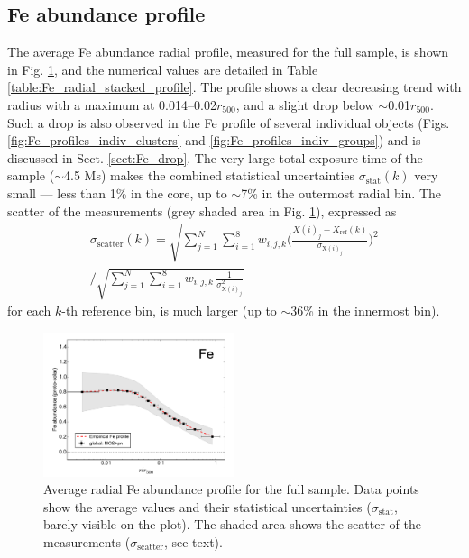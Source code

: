 \documentclass{aa}
\begin{document}
\subsection{Fe abundance profile}\label{sect:results_Fe}

The average Fe abundance radial profile, measured for the full sample, is shown in Fig. \ref{fig:Fe_radial_stacked_profile}, and the numerical values are detailed in Table \ref{table:Fe_radial_stacked_profile}. The profile shows a clear decreasing trend with radius with a maximum at 0.014--0.02$r_{500}$, and a slight drop below $\sim$0.01$r_{500}$. Such a drop is also observed in the Fe profile of several individual objects (Figs. \ref{fig:Fe_profiles_indiv_clusters} and \ref{fig:Fe_profiles_indiv_groups}) and is discussed in Sect. \ref{sect:Fe_drop}. The very large total exposure time of the sample ($\sim$4.5 Ms) makes the combined statistical uncertainties $\sigma_\text{stat}(k)$ very small --- less than 1\% in the core, up to $\sim$7\% in the outermost radial bin. The scatter of the measurements (grey shaded area in Fig. \ref{fig:Fe_radial_stacked_profile}), expressed as
\begin{align}
\sigma_\text{scatter}(k) = \sqrt{ \sum_{j=1}^{N} \sum_{i=1}^{8} w_{i,j,k} \bigg( \frac{X(i)_j - X_\text{ref}(k)}{\sigma_{\text{X}(i)_j}} \bigg)^2 } \nonumber \\
\Bigg/ \sqrt{ \sum_{j=1}^{N} \sum_{i=1}^{8} w_{i,j,k} \, \frac{1}{\sigma_{\text{X}(i)_j}^2} }
\end{align}
for each $k$-th reference bin, is much larger (up to $\sim$36\% in the innermost bin). 



\begin{figure}[!]

                \includegraphics[width=0.5\textwidth]{fig_radial_stacked_Fe.pdf}

        \caption{Average radial Fe abundance profile for the full sample. Data points show the average values and their statistical uncertainties ($\sigma_\text{stat}$, barely visible on the plot). The shaded area shows the scatter of the measurements ($\sigma_\text{scatter}$, see text).}
\label{fig:Fe_radial_stacked_profile}
\end{figure}
\end{document}
